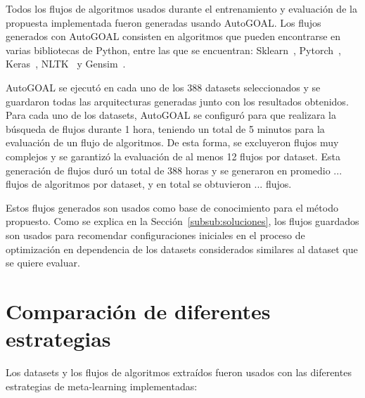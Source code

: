 
Todos los flujos de algoritmos usados durante el entrenamiento y evaluación de la propuesta implementada fueron generadas usando AutoGOAL. Los flujos generados con AutoGOAL consisten en algoritmos que pueden encontrarse en varias bibliotecas de Python, entre las que se encuentran: Sklearn~\cite{scikit-learn}, Pytorch~\cite{paszke2019pytorch}, Keras~\cite{chollet2015keras}, NLTK~\cite{bird2009natural} y Gensim~\cite{khosrovian2008gensim}.

AutoGOAL se ejecutó en cada uno de los 388 datasets seleccionados y se guardaron todas las arquitecturas generadas junto con los resultados obtenidos. Para cada uno de los datasets, AutoGOAL se configuró para que realizara la búsqueda de flujos durante 1 hora, teniendo un total de 5 minutos para la evaluación de un flujo de algoritmos. De esta forma, se excluyeron flujos muy complejos y se garantizó la evaluación de al menos 12 flujos por dataset. Esta generación de flujos duró un total de 388 horas y se generaron en promedio ... flujos de algoritmos por dataset, y en total se obtuvieron ...  flujos. 

Estos flujos generados son usados como base de conocimiento para el método propuesto. Como se explica en la Sección~\ref{subsub:soluciones}, los flujos guardados son usados para recomendar configuraciones iniciales en el proceso de optimización en dependencia de los datasets considerados similares al dataset que se quiere evaluar.

\section{Comparación de diferentes estrategias}\label{sec:comparacion}

%

Los datasets y los flujos de algoritmos extraídos fueron usados con las diferentes estrategias de meta-learning implementadas:

